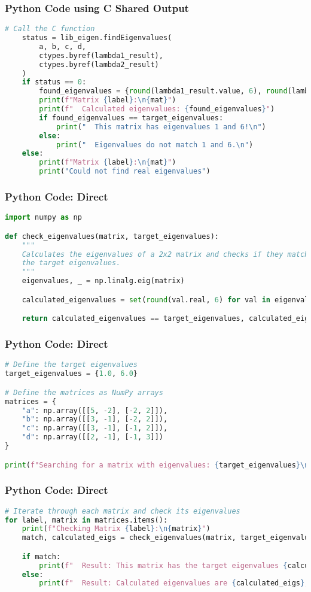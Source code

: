 \documentclass{beamer}
\begin{document}
\begin{frame}[fragile]\frametitle{Python Code using C Shared Output}
\begin{lstlisting}[language=Python]
    # Call the C function
    status = lib_eigen.findEigenvalues(
        a, b, c, d,
        ctypes.byref(lambda1_result),
        ctypes.byref(lambda2_result)
    )
    if status == 0:
        found_eigenvalues = {round(lambda1_result.value, 6), round(lambda2_result.value, 6)}
        print(f"Matrix {label}:\n{mat}")
        print(f"  Calculated eigenvalues: {found_eigenvalues}")
        if found_eigenvalues == target_eigenvalues:
            print("  This matrix has eigenvalues 1 and 6!\n")
        else:
            print("  Eigenvalues do not match 1 and 6.\n")
    else:
        print(f"Matrix {label}:\n{mat}")
        print("Could not find real eigenvalues")
\end{lstlisting}
\end{frame}

\begin{frame}[fragile]\frametitle{Python Code: Direct}
\begin{lstlisting}[language=Python]
import numpy as np

def check_eigenvalues(matrix, target_eigenvalues):
    """
    Calculates the eigenvalues of a 2x2 matrix and checks if they match
    the target eigenvalues.
    """
    eigenvalues, _ = np.linalg.eig(matrix)

    calculated_eigenvalues = set(round(val.real, 6) for val in eigenvalues)

    return calculated_eigenvalues == target_eigenvalues, calculated_eigenvalues
\end{lstlisting}
\end{frame}

\begin{frame}[fragile]\frametitle{Python Code: Direct}
\begin{lstlisting}[language=Python]
# Define the target eigenvalues
target_eigenvalues = {1.0, 6.0}

# Define the matrices as NumPy arrays
matrices = {
    "a": np.array([[5, -2], [-2, 2]]),
    "b": np.array([[3, -1], [-2, 2]]),
    "c": np.array([[3, -1], [-1, 2]]),
    "d": np.array([[2, -1], [-1, 3]])
}

print(f"Searching for a matrix with eigenvalues: {target_eigenvalues}\n")
\end{lstlisting}
\end{frame}

\begin{frame}[fragile]\frametitle{Python Code: Direct}
\begin{lstlisting}[language=Python]
# Iterate through each matrix and check its eigenvalues
for label, matrix in matrices.items():
    print(f"Checking Matrix {label}:\n{matrix}")
    match, calculated_eigs = check_eigenvalues(matrix, target_eigenvalues)

    if match:
        print(f"  Result: This matrix has the target eigenvalues {calculated_eigs}!\n")
    else:
        print(f"  Result: Calculated eigenvalues are {calculated_eigs}, which do NOT match the target.\n")
\end{lstlisting}
\end{frame}
\end{document}

